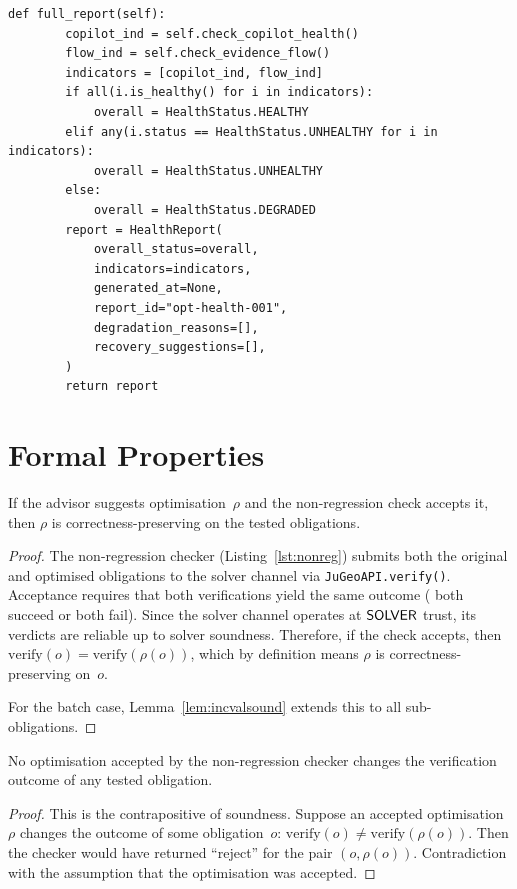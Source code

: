 \documentclass[11pt]{article}
\begin{document}
\begin{lstlisting}[style=jugeo-python,
  caption={Health monitoring for the optimisation subsystem},
  label={lst:opthealth}]
    def full_report(self):
        copilot_ind = self.check_copilot_health()
        flow_ind = self.check_evidence_flow()
        indicators = [copilot_ind, flow_ind]
        if all(i.is_healthy() for i in indicators):
            overall = HealthStatus.HEALTHY
        elif any(i.status == HealthStatus.UNHEALTHY for i in indicators):
            overall = HealthStatus.UNHEALTHY
        else:
            overall = HealthStatus.DEGRADED
        report = HealthReport(
            overall_status=overall,
            indicators=indicators,
            generated_at=None,
            report_id="opt-health-001",
            degradation_reasons=[],
            recovery_suggestions=[],
        )
        return report
\end{lstlisting}

\section{Formal Properties}\label{sec:formal}

\begin{theorem}\label{thm:optsound}
If the advisor suggests optimisation~$\rho$ and the
non-regression check accepts it, then $\rho$ is
correctness-preserving on the tested obligations.
\end{theorem}
\begin{proof}
The non-regression checker (Listing~\ref{lst:nonreg})
submits both the original and optimised obligations
to the solver channel via \texttt{JuGeoAPI.verify()}.
Acceptance requires that both verifications yield the
same outcome (\ie{} both succeed or both fail).
Since the solver channel operates at $\mathsf{SOLVER}$ trust,
its verdicts are reliable up to solver soundness.
Therefore, if the check accepts, then
$\mathrm{verify}(o) = \mathrm{verify}(\rho(o))$,
which by definition means $\rho$ is correctness-preserving
on~$o$.

For the batch case, Lemma~\ref{lem:incvalsound} extends
this to all sub-obligations.
\end{proof}

\begin{theorem}\label{thm:nonreg}
No optimisation accepted by the non-regression checker
changes the verification outcome of any tested obligation.
\end{theorem}
\begin{proof}
This is the contrapositive of soundness.  Suppose an
accepted optimisation~$\rho$ changes the outcome of some
obligation~$o$: $\mathrm{verify}(o) \neq
\mathrm{verify}(\rho(o))$.  Then the checker would have
returned ``reject'' for the pair $(o, \rho(o))$.
Contradiction with the assumption that the optimisation
was accepted.
\end{proof}
\end{document}
